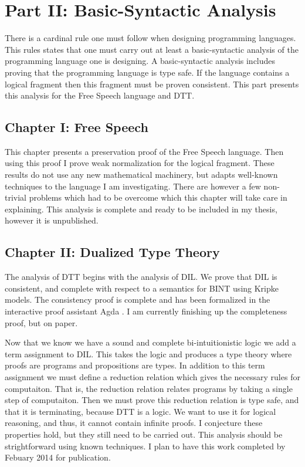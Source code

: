 \section{Part II: Basic-Syntactic Analysis}
\label{sec:syntactic_analysis}

There is a cardinal rule one must follow when designing programming
languages.  This rules states that one must carry out at least a
basic-syntactic analysis of the programming language one is designing.
A basic-syntactic analysis includes proving that the programming
language is type safe.  If the language contains a logical fragment
then this fragment must be proven consistent.  This part presents this
analysis for the Free Speech language and DTT.

\subsection{Chapter I: Free Speech}
\label{subsec:free_speech}
This chapter presents a preservation proof of the Free Speech
language.  Then using this proof I prove weak normalization for the
logical fragment.  These results do not use any new mathematical
machinery, but adapts well-known techniques to the language I am
investigating.  There are however a few non-trivial problems which had
to be overcome which this chapter will take care in explaining.  This
analysis is complete and ready to be included in my thesis, however it
is unpublished.

\subsection{Chapter II: Dualized Type Theory}
\label{subsec:dtt}
The analysis of DTT begins with the analysis of DIL.  We prove that
DIL is consistent, and complete with respect to a semantics for BINT
using Kripke models.  The consistency proof is complete and has been
formalized in the interactive proof assistant Agda \cite{Norell:2007}.
I am currently finishing up the completeness proof, but on paper.

Now that we know we have a sound and complete bi-intuitionistic logic
we add a term assignment to DIL.  This takes the logic and produces a
type theory where proofs are programs and propositions are types.  In
addition to this term assignment we must define a reduction relation
which gives the necessary rules for computaiton.  That is, the
reduction relation relates programs by taking a single step of
computaiton. Then we must prove this reduction relation is type safe,
and that it is terminating, because DTT is a logic.  We want to use it
for logical reasoning, and thus, it cannot contain infinite proofs.  I
conjecture these properties hold, but they still need to be carried
out.  This analysis should be strightforward using known techniques.
I plan to have this work completed by Febuary 2014 for publication.

